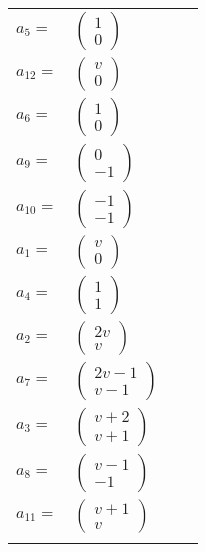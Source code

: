 \documentclass[1p]{elsarticle_modified}
\theoremstyle{definition}
\begin{document}
\begin{tabular}{m{7pt} m{180pt} m{7pt} m{180pt} }
\flushright $a_{5}=$&$\begin{pmatrix}1\\0\end{pmatrix}$ \\
\flushright $a_{12}=$&$\begin{pmatrix}v\\0\end{pmatrix}$ \\
\flushright $a_{6}=$&$\begin{pmatrix}1\\0\end{pmatrix}$ \\
\flushright $a_{9}=$&$\begin{pmatrix}0\\-1\end{pmatrix}$ \\
\flushright $a_{10}=$&$\begin{pmatrix}-1\\-1\end{pmatrix}$ \\
\flushright $a_{1}=$&$\begin{pmatrix}v\\0\end{pmatrix}$ \\
\flushright $a_{4}=$&$\begin{pmatrix}1\\1\end{pmatrix}$ \\
\flushright $a_{2}=$&$\begin{pmatrix}2 v\\v\end{pmatrix}$ \\
\flushright $a_{7}=$&$\begin{pmatrix}2 v-1\\v-1\end{pmatrix}$ \\
\flushright $a_{3}=$&$\begin{pmatrix}v+2\\v+1\end{pmatrix}$ \\
\flushright $a_{8}=$&$\begin{pmatrix}v-1\\-1\end{pmatrix}$ \\
\flushright $a_{11}=$&$\begin{pmatrix}v+1\\v\end{pmatrix}$\\&\end{tabular}
\end{document}
